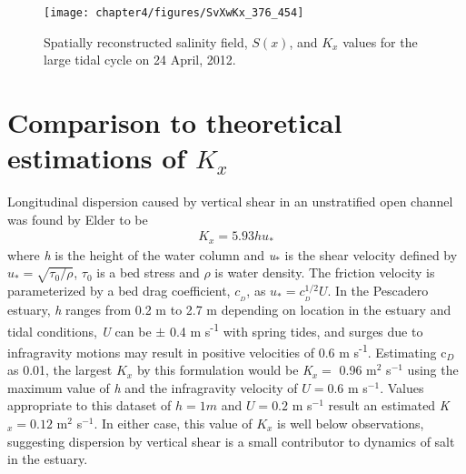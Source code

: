 \begin{figure}[hp]
\centering
	\texttt{[image: chapter4/figures/SvXwKx\_376\_454]} 
\caption{Spatially reconstructed salinity field, $S(x)$, and $K_x$ values for the large tidal cycle on 24 April, 2012.} \label{fig:Kx424}
\end{figure}




\section{Comparison to theoretical estimations of $K_x$}

Longitudinal dispersion caused by vertical shear in an unstratified open channel was found by Elder \parencite*{elder_dispersion_1959} to be
\begin{eqnarray}
K_x = 5.93hu_* \label{eq:Kvertshear}
\end{eqnarray}
where \emph{h} is the height of the water column and \emph{u$_*$} is the shear velocity defined by $u_*=\sqrt{\tau_0/\rho}$, $\tau_0$ is a bed stress and $\rho$ is water density. The friction velocity is parameterized by a bed drag coefficient, $c_{_D}$, as $u_* = c_{_D}^{1/2}U$. In the Pescadero estuary, \emph{h} ranges from 0.2 m to 2.7 m depending on location in the estuary and tidal conditions, \emph{U} can be $\pm$ 0.4 m s\textsuperscript{-1} with spring tides, and surges due to infragravity motions may result in positive velocities of 0.6 m s\textsuperscript{-1}. Estimating c$_D$ as 0.01, the largest $K_x$ by this formulation would be \emph{K}$_x =$ 0.96 m$^2$ s$^{-1}$ using the maximum value of \emph{h} and the infragravity velocity of $U = 0.6$ m s$^{-1}$. Values appropriate to this dataset of $h = 1 m$ and $U = 0.2$ m s$^{-1}$ result an estimated \emph{K}$_x = 0.12$ m$^2$ s$^{-1}$. In either case, this value of $K_x$ is well below observations, suggesting dispersion by vertical shear is a small contributor to dynamics of salt in the estuary.

